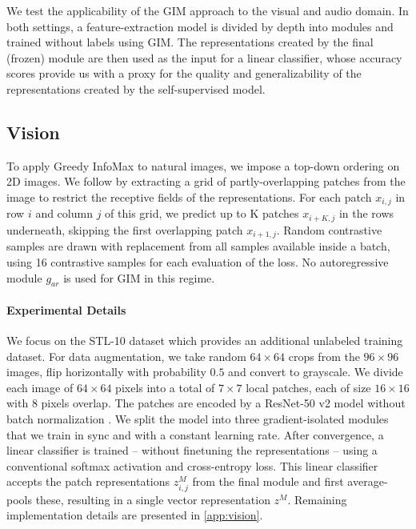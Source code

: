 \documentclass{article}
\begin{document}
We test the applicability of the GIM approach to the visual and audio domain. In both settings, a feature-extraction model is divided by depth into modules and trained without labels using GIM. The representations created by the final (frozen) module are then used as the input for a linear classifier, whose accuracy scores provide us with a proxy for the quality and generalizability of the representations created by the self-supervised model.

\subsection{Vision} \label{sec:vision}
To apply Greedy InfoMax to natural images, we impose a top-down ordering on 2D images. We follow \citet{oord2018representation,Henaff2019-nb} by extracting a grid of partly-overlapping patches from the image to restrict the receptive fields of the representations. For each patch $x_{i,j}$ in row $i$ and column $j$ of this grid, we predict up to K patches $x_{i+K,j}$ in the rows underneath, skipping the first overlapping patch $x_{i+1,j}$. Random contrastive samples are drawn with replacement from all samples available inside a batch, using 16 contrastive samples for each evaluation of the loss. No autoregressive module $g_{ar}$ is used for GIM in this regime.

\paragraph{Experimental Details} We focus on the STL-10 dataset \citep{coates2011analysis} which provides an additional unlabeled training dataset. For data augmentation, we take random $64 \times 64$ crops from the $96 \times 96$ images, flip horizontally with probability $0.5$ and convert to grayscale. We divide each image of $64 \times 64$ pixels into a total of $7 \times 7$ local patches, each of size $16 \times 16$ with 8 pixels overlap. The patches are encoded by a ResNet-50 v2 model \citep{he2016identity} without batch normalization \citep{ioffe2015batch}. We split the model into three gradient-isolated modules that we train in sync and with a constant learning rate. After convergence, a linear classifier is trained -- without finetuning the representations -- using a conventional softmax activation and cross-entropy loss. This linear classifier accepts the patch representations $z^M_{i,j}$ from the final module and first  average-pools these, resulting in a single vector representation $z^M$.  Remaining implementation details are presented in \cref{app:vision}.
\end{document}
